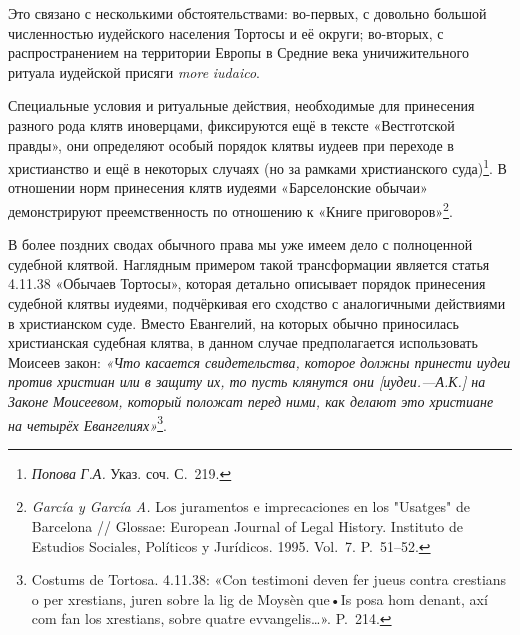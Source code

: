 Это связано с несколькими обстоятельствами: во-первых, с довольно большой численностью иудейского населения Тортосы и её округи; во-вторых, с распространением на территории Европы в Средние века уничижительного ритуала иудейской присяги \emph{more}\emph{ }\emph{iudaico}.

Специальные условия и ритуальные действия, необходимые для принесения разного рода клятв иноверцами, фиксируются ещё в тексте «Вестготской правды», они определяют особый порядок клятвы иудеев при переходе в христианство и ещё в некоторых случаях (но за рамками христианского суда)\footnote{\emph{ }\emph{Попова}\emph{ }\emph{Г}\emph{.}\emph{А}\emph{. }Указ. соч. С.~219.}. В отношении норм принесения клятв иудеями «Барселонские обычаи» демонстрируют преемственность по отношению к «Книге приговоров»\footnote{\emph{García y García A. }Los juramentos e imprecaciones en los "Usatges" de Barcelona // Glossae: European Journal of Legal History. Instituto de Estudios Sociales, Políticos y Jurídicos. 1995. Vol.~7. P.~51--52.}.

В более поздних сводах обычного права мы уже имеем дело с полноценной судебной клятвой. Наглядным примером такой трансформации является статья 4.11.38 «Обычаев Тортосы», которая детально описывает порядок принесения судебной клятвы иудеями, подчёркивая его сходство с аналогичными действиями в христианском суде. Вместо Евангелий, на которых обычно приносилась христианская судебная клятва, в данном случае предполагается использовать Моисеев закон: \emph{«Что касается свидетельства, которое должны принести иудеи против христиан или в защиту их, то пусть клянутся они [иудеи.---А.К.] на Законе Моисеевом, который положат перед ними, как делают это христиане на четырёх Евангелиях»}\footnote{Costums de Tortosa. 4.11.38: «Con testimoni deven fer jueus contra crestians o per xrestians, juren sobre la lig de Moysèn que•Is posa hom denant, axí com fan los xrestians, sobre quatre evvangelis…». P.~214.}.

